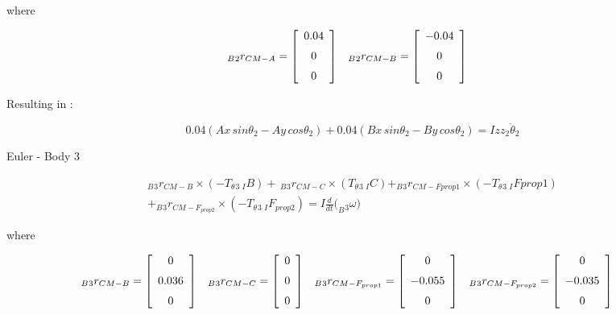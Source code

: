 where

\begin{align*}
_B{_2}{r}_{CM-A} &= \left[ \begin {array}{c} 0.04\\ \noalign{\medskip}0\\ \noalign{\medskip}0
\end {array} \right] &
_B{_2}{r}_{CM-B} &= \left[ \begin {array}{c} -0.04\\ \noalign{\medskip}0\\ \noalign{\medskip}0
\end {array} \right]&
\end{align*}

Resulting in :

\begin{equation}\label{euler2end}
	0.04(Ax\,sin\theta_{{2}} - Ay\, cos\theta_{{2}}) + 0.04(Bx\, sin\theta_{{2}} - By\, cos\theta_{{2}}) = Izz_{{2}}\ddot\theta_{{2}}
\end{equation}

Euler -  Body 3
 
\begin{equation}\label{euler3}\begin{split}
	_B{_3}{r}_{CM-B}\times (-T_\theta{_3} \, {_I}{B}) + \,_B{_3}{r}_{CM-C} \times (T_\theta{_3} \, {_I}{C}) + _B{_3}{r}_{CM-F{prop1}}\times (-T_\theta{_3} \, {_I}F{prop1})  \\ +  _B{_3}{r}_{CM-F_{prop2}}\times (-T_\theta{_3} \, {_I}F_{prop2}) = I  \frac{d}{dt}(_B{_3}{\omega)}
	\end{split}
\end{equation}
 
 where

\begin{align*}
_B{_3}{r}_{CM-B} &= \left[ \begin {array}{c} 0\\ \noalign{\medskip}0.036\\ \noalign{\medskip}0
\end {array} \right] &
_B{_3}{r}_{CM-C} &= \left[ \begin {array}{c} 0\\ \noalign{\medskip}0\\ \noalign{\medskip}0
\end {array} \right]&
_B{_3}{r}_{CM-F_{prop1}} &= \left[ \begin {array}{c} 0\\ \noalign{\medskip}-0.055\\ \noalign{\medskip}0
\end {array} \right]&
_B{_3}{r}_{CM-F_{prop2}} &= \left[ \begin {array}{c}0\\ \noalign{\medskip}-0.035\\ \noalign{\medskip}0
\end {array} \right]&
\end{align*}

